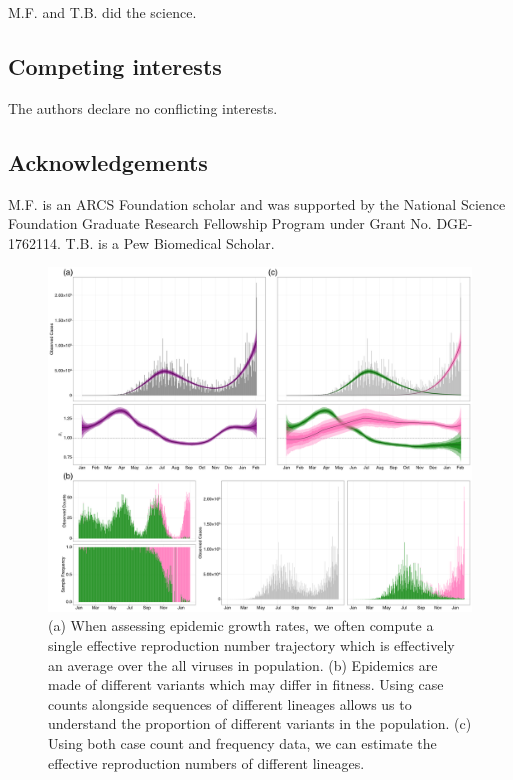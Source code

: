 \documentclass[12pt]{article}
\begin{document}
M.F. and T.B. did the science.

\subsection*{Competing interests}%

The authors declare no conflicting interests.

\subsection*{Acknowledgements}%

M.F. is an ARCS Foundation scholar and was supported by the National Science Foundation Graduate Research Fellowship Program under Grant No. DGE-1762114.
T.B. is a Pew Biomedical Scholar.

\begin{figure}
  \centering
  \includegraphics[width=\linewidth]{figs/fig_1.png}
  \caption{ (a) When assessing epidemic growth rates, we often compute a single effective reproduction number trajectory which is effectively an average over the all viruses in population.
    (b) Epidemics are made of different variants which may differ in fitness. Using case counts alongside sequences of different lineages allows us to understand the proportion of different variants in the population.
(c) Using both case count and frequency data, we can estimate the effective reproduction numbers of different lineages.}%
  \label{fig:1}
\end{figure}
\end{document}
